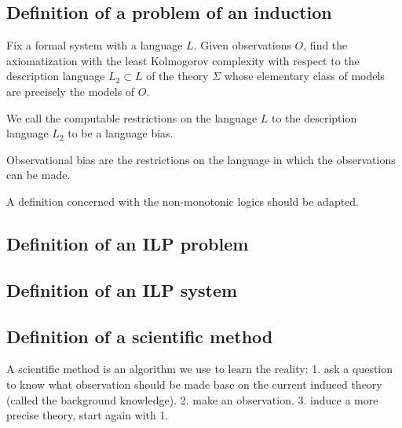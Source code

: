 \subsection{Definition of a problem of an induction}
Fix a formal system with a language $L$. Given observations $O$, find the axiomatization with the least Kolmogorov complexity with respect to the description language $L_2 \subset L$ of the theory $\Sigma$ whose elementary class of models are precisely the models of $O$.

We call the computable restrictions on the language $L$ to the description language $L_2$ to be a language bias.

Observational bias are the restrictions on the language in which the observations can be made.

A definition concerned with the non-monotonic logics should be adapted.

\subsection{Definition of an ILP problem}

\subsection{Definition of an ILP system}

\subsection{Definition of a scientific method}
A scientific method is an algorithm we use to learn the reality:
1. ask a question to know what observation should be made base on the current induced theory (called the background knowledge).
2. make an observation.
3. induce a more precise theory, start again with 1.